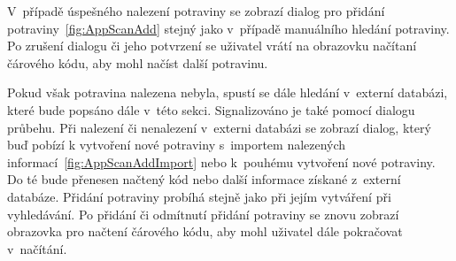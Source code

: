 \documentclass[thesis=B,czech]{FITthesis}[2013/10/20]
\begin{document}
V~případě úspešného nalezení potraviny se zobrazí dialog pro přidání potraviny~\ref{fig:AppScanAdd} stejný jako v~případě manuálního hledání potraviny. Po zrušení dialogu či jeho potvrzení se uživatel vrátí na obrazovku načítaní čárového kódu, aby mohl načíst další potravinu.

Pokud však potravina nalezena nebyla, spustí se dále hledání v~externí databázi, které bude popsáno dále v~této sekci. Signalizováno je také pomocí dialogu průbehu. Při nalezení či nenalezení v~externi databázi se zobrazí dialog, který buď pobízí k vytvoření nové potraviny s~importem nalezených informací~\ref{fig:AppScanAddImport} nebo k~pouhému vytvoření nové potraviny. Do té bude přenesen načtený kód nebo další informace získané z~externí databáze. Přidání potraviny probíhá stejně jako při jejím vytváření při vyhledávání. Po přidání či odmítnutí přidání potraviny se znovu zobrazí obrazovka pro načtení čárového kódu, aby mohl uživatel dále pokračovat v~načítání.
\end{document}
